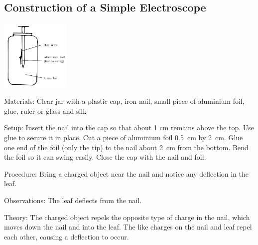 \begin{multicols}{2}
\subsection{Construction of a Simple Electroscope}

\begin{center}
\includegraphics[width=0.25\textwidth]{./img/al-leaf-electroscope.png}
\end{center}

\begin{description*}
\item[Materials:]{Clear jar with a plastic cap, iron nail, small piece of aluminium foil, glue, ruler or glass and silk}
\item[Setup:]{Insert the nail into the cap so that about 1 cm remains above the top. Use glue to secure it in place. Cut a piece of aluminium foil 0.5~cm by 2~cm. Glue one end of the foil (only the tip) to the nail about 2~cm from the bottom. Bend the foil so it can swing easily. Close the cap with the nail and foil.}
\item[Procedure:]{Bring a charged object near the nail and notice any deflection in the leaf.}
\item[Observations:]{The leaf deflects from the nail.}
\item[Theory:]{The charged object repels the opposite type of charge in the nail, which moves down the nail and into the leaf. The like charges on the nail and leaf repel each other, causing a deflection to occur.}
\end{description*}



\end{multicols}
